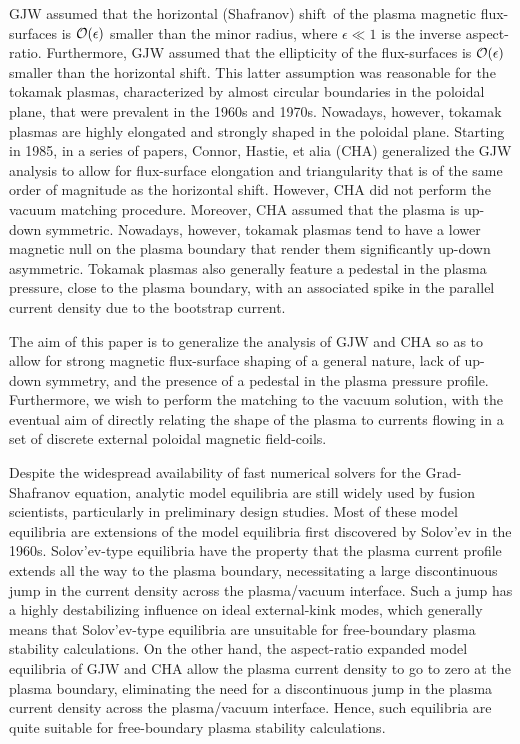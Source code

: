 \documentclass[12pt,prb,aps]{revtex4-1}
\begin{document}
GJW assumed that the horizontal (Shafranov) shift\,\cite{shaf} of the plasma magnetic flux-surfaces is
${\cal O}(\epsilon)$ smaller than the minor radius, where $\epsilon\ll 1$ is the inverse aspect-ratio. Furthermore, GJW assumed that the
ellipticity of the flux-surfaces is ${\cal O}(\epsilon)$ smaller than the horizontal shift. This latter assumption was reasonable for the tokamak plasmas, 
characterized by almost circular boundaries in the poloidal plane, that were prevalent in the 1960s and 1970s. Nowadays, however,  tokamak plasmas
are  highly elongated and strongly shaped in the poloidal plane.\cite{wesson}  Starting in 1985,  in a series of papers, Connor, Hastie, et alia (CHA) generalized the GJW analysis to
allow for flux-surface elongation and triangularity that is of the same order of magnitude as the horizontal shift. \cite{con0,con,gim,fitz93}
However, CHA did not perform the vacuum matching procedure. Moreover, CHA assumed that the plasma is
up-down symmetric. Nowadays, however, tokamak plasmas tend to have a lower magnetic null on the plasma boundary that render them significantly up-down asymmetric.\cite{wesson}  Tokamak plasmas also generally feature a pedestal in the plasma pressure, close to the plasma boundary, with an associated
spike in the parallel current density due to the bootstrap current.\cite{wesson}

The aim of this paper is to generalize the analysis of GJW and CHA so as to allow for strong magnetic flux-surface shaping of a general nature, lack of up-down symmetry,
and the presence of a pedestal in the plasma pressure profile. 
Furthermore, we wish to perform the matching to the vacuum solution, with the eventual aim of directly relating the shape of the plasma to
currents flowing in a set of discrete external poloidal magnetic field-coils. 

Despite the widespread availability of fast numerical solvers for the Grad-Shafranov equation,\cite{helena,chease} analytic model equilibria are still widely used by fusion scientists,\cite{sol,model,model1} particularly in preliminary design studies. Most of these model equilibria are extensions of the 
model equilibria first discovered by Solov'ev in the 1960s.\cite{sol}  Solov'ev-type equilibria have the property that the plasma current profile extends all the way to the plasma
boundary, necessitating a large discontinuous jump in the  current density across the plasma/vacuum interface. Such a jump has a highly
destabilizing influence on ideal external-kink modes,\cite{fred}  which generally means that Solov'ev-type equilibria are unsuitable for free-boundary plasma 
stability 
calculations. On the other hand, the aspect-ratio expanded model equilibria of GJW and CHA allow the plasma current density to go to zero at the
plasma boundary, eliminating the need for a discontinuous jump in the plasma current density across the plasma/vacuum interface. Hence, such equilibria are
quite suitable for free-boundary plasma stability calculations. 
\end{document}
